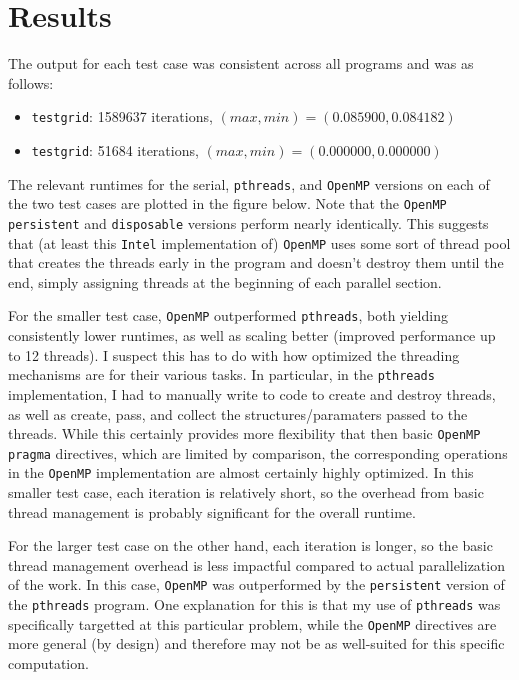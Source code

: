 \documentclass{article}
\begin{document}
\newpage
\section*{Results}
\label{sec:results}

The output for each test case was consistent across all programs and was as follows:
\begin{itemize}
    \item \texttt{testgrid}: 1589637 iterations, $(max, min) = (0.085900, 0.084182)$
    \item \texttt{testgrid}: 51684 iterations, $(max, min) = (0.000000, 0.000000)$
\end{itemize}

The relevant runtimes for the serial, \texttt{pthreads}, and \texttt{OpenMP}
versions on each of the two test cases are plotted in the figure below. Note
that the \texttt{OpenMP} \texttt{persistent} and \texttt{disposable} versions
perform nearly identically. This suggests that (at least this \texttt{Intel}
implementation of) \texttt{OpenMP} uses some sort of thread pool that creates
the threads early in the program and doesn't destroy them until the end, simply
assigning threads at the beginning of each parallel section.

For the smaller test case, \texttt{OpenMP} outperformed \texttt{pthreads}, both
yielding consistently lower runtimes, as well as scaling better (improved
performance up to 12 threads). I suspect this has to do with how optimized the
threading mechanisms are for their various tasks. In particular, in the
\texttt{pthreads} implementation, I had to manually write to code to create and
destroy threads, as well as create, pass, and collect the structures/paramaters
passed to the threads. While this certainly provides more flexibility that then
basic \texttt{OpenMP} \texttt{pragma} directives, which are limited by
comparison, the corresponding operations in the \texttt{OpenMP} implementation
are almost certainly highly optimized. In this smaller test case, each
iteration is relatively short, so the overhead from basic thread management is
probably significant for the overall runtime.

For the larger test case on the other hand, each iteration is longer, so the
basic thread management overhead is less impactful compared to actual
parallelization of the work.  In this case, \texttt{OpenMP} was outperformed by
the \texttt{persistent} version of the \texttt{pthreads} program. One
explanation for this is that my use of \texttt{pthreads} was specifically
targetted at this particular problem, while the \texttt{OpenMP} directives are
more general (by design) and therefore may not be as well-suited for this
specific computation.
\end{document}
